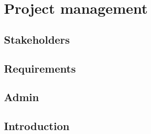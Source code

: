 \documentclass{report}
\title{}
\author{}
\date{}
\begin{document}
\pagestyle{super}
 
 \chapter{Project management}
 
 \newpage
 
 
 \newpage
 \section{Stakeholders}
 
 \section{Requirements}
 
 
  \section{Admin}
 


\section{Introduction}



\printbibliography
\end{document}
